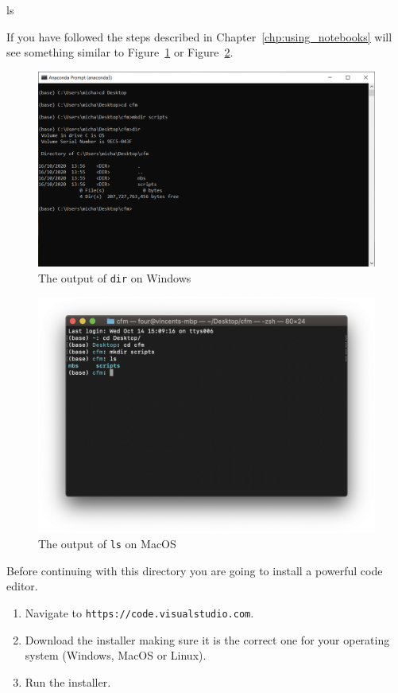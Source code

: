\begin{pyin}
ls
\end{pyin}





If you have followed the steps described in Chapter~\ref{chp:using_notebooks}
will see something similar to Figure~\ref{fig:contents_of_directory_on_windows}
or Figure~\ref{fig:contents_of_directory_on_MacOS}.

\begin{figure}[htbp]
\centering
\noindent\includegraphics[width=0.750\linewidth]{./assets/output_of_dir/main.png}
\caption{The output of \texttt{dir} on Windows}
\label{fig:contents_of_directory_on_windows}
\end{figure}


\begin{figure}[htbp]
\centering
\noindent\includegraphics[width=0.750\linewidth]{./assets/output_of_ls/main.png}
\caption{The output of \texttt{ls} on MacOS}
\label{fig:contents_of_directory_on_MacOS}
\end{figure}


Before continuing with this directory you are going to install a
powerful code editor.
\begin{enumerate}

\item 

Navigate to \texttt{https://code.visualstudio.com}.

\item 

Download the installer making sure it is the correct one for your operating
system (Windows, MacOS or Linux).

\item 

Run the installer.

\end{enumerate}


